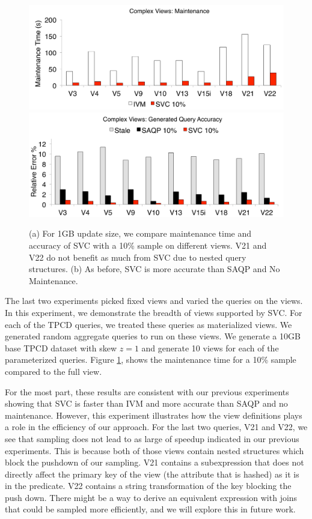 \begin{figure}[t]
\centering
 \includegraphics[scale=0.19]{exp/msqv_1.pdf}
 \includegraphics[scale=0.19]{exp/msqv_2.pdf}

 \caption{(a) For 1GB update size, we compare maintenance time and accuracy of SVC with a 10\% sample on different views. V21 and V22 do not benefit as much from SVC due to nested query structures. (b) As before, SVC is more accurate than SAQP and No Maintenance. \label{exp3-acc}}
\end{figure}

The last two experiments picked fixed views and varied the queries on the views.
In this experiment, we demonstrate the breadth of views supported by SVC.
For each of the TPCD queries, we treated these queries as materialized views.
We generated random aggregate queries to run on these views.
We generate a 10GB base TPCD dataset with skew $z=1$ and generate 10 views for
each of the parameterized queries.
Figure \ref{exp3-acc}, shows the maintenance time for a 10\% sample compared to the full view.

For the most part, these results are consistent with our previous experiments showing that SVC is faster than IVM and more accurate than SAQP and no maintenance.
However, this experiment illustrates how the view definitions plays a role in the efficiency of our approach.
For the last two queries, V21 and V22, we see that sampling does not lead to as large of speedup indicated in our previous experiments.
This is because both of those views contain nested structures which block the pushdown of our sampling.
V21 contains a subexpression that does not directly affect the primary key of the view (the attribute that is hashed) as it is in the predicate.
V22 contains a string transformation of the key blocking the push down.
There might be a way to derive an equivalent expression with joins that could be sampled more efficiently, and we will explore this in future work.


